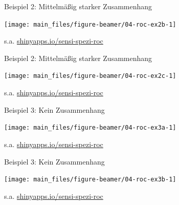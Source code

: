 \documentclass[
  10pt,
  ignorenonframetext,
]{beamer}
\begin{document}
\begin{frame}{Beispiel 2: Mittelmäßig starker Zusammenhang}
\label{beispiel-2-mittelmuxe4uxdfig-starker-zusammenhang-1}
\scriptsize

\begin{center}\texttt{[image: main\_files/figure-beamer/04-roc-ex2b-1]} \end{center}

\normalsize
\tiny

s.a.
\href{https://fabian-s.shinyapps.io/sensi-spezi-roc/}{shinyapps.io/sensi-spezi-roc}
\end{frame}

\begin{frame}{Beispiel 2: Mittelmäßig starker Zusammenhang}
\label{beispiel-2-mittelmuxe4uxdfig-starker-zusammenhang-2}
\scriptsize

\begin{center}\texttt{[image: main\_files/figure-beamer/04-roc-ex2c-1]} \end{center}

\normalsize
\tiny

s.a.
\href{https://fabian-s.shinyapps.io/sensi-spezi-roc/}{shinyapps.io/sensi-spezi-roc}
\end{frame}

\begin{frame}{Beispiel 3: Kein Zusammenhang}
\label{beispiel-3-kein-zusammenhang}
\scriptsize

\begin{center}\texttt{[image: main\_files/figure-beamer/04-roc-ex3a-1]} \end{center}

\normalsize
\tiny

s.a.
\href{https://fabian-s.shinyapps.io/sensi-spezi-roc/}{shinyapps.io/sensi-spezi-roc}
\end{frame}

\begin{frame}{Beispiel 3: Kein Zusammenhang}
\label{beispiel-3-kein-zusammenhang-1}
\scriptsize

\begin{center}\texttt{[image: main\_files/figure-beamer/04-roc-ex3b-1]} \end{center}

\normalsize
\tiny

s.a.
\href{https://fabian-s.shinyapps.io/sensi-spezi-roc/}{shinyapps.io/sensi-spezi-roc}
\end{frame}
\end{document}
